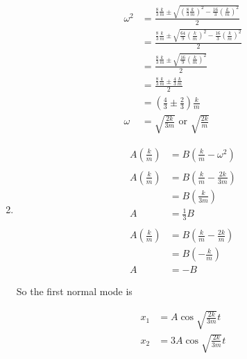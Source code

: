 \documentclass{article}
\begin{document}
\begin{enumerate}
        \begin{align*}
          \omega^2 & = \frac{\frac{8}{3} \frac{k}{m} \pm \sqrt{\left( \frac{8}{3} \frac{k}{m} \right)^2 - \frac{16}{3} \left( \frac{k}{m} \right)^2}}{2}  \\
                   & = \frac{\frac{8}{3} \frac{k}{m} \pm \sqrt{\frac{64}{9} \left( \frac{k}{m} \right)^2 - \frac{16}{3} \left( \frac{k}{m} \right)^2}}{2} \\
                   & = \frac{\frac{8}{3} \frac{k}{m} \pm \sqrt{\frac{16}{9} \left( \frac{k}{m} \right)^2}}{2}                                             \\
                   & = \frac{\frac{8}{3} \frac{k}{m} \pm \frac{4}{3} \frac{k}{m}}{2}                                                                      \\
                   & = \left( \frac{4}{3} \pm \frac{2}{3} \right) \frac{k}{m}                                                                             \\
          \omega   & = \sqrt{\frac{2 k}{3 m}} \text{ or } \sqrt{\frac{2 k}{m}}
        \end{align*}

  \item

        \begin{align*}
          A \left( \frac{k}{m} \right) & = B \left( \frac{k}{m} - \omega^2 \right)        \\ \\
          A \left( \frac{k}{m} \right) & = B \left( \frac{k}{m} - \frac{2 k}{3 m} \right) \\
                                       & = B \left( \frac{k}{3 m} \right)                 \\
          A                            & = \frac{1}{3} B                                  \\ \\
          A \left( \frac{k}{m} \right) & = B \left( \frac{k}{m} - \frac{2 k}{m} \right)   \\
                                       & = B \left( -\frac{k}{m} \right)                  \\
          A                            & = -B
        \end{align*}

        So the first normal mode is

        \begin{align*}
          x_1 & = A \cos \sqrt{\frac{2 k}{3 m}} t   \\
          x_2 & = 3 A \cos \sqrt{\frac{2 k}{3 m}} t
        \end{align*}


\end{enumerate}
\end{document}
